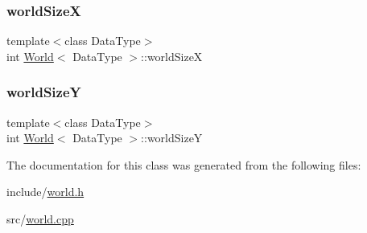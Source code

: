 \hypertarget{class_world_a63c69cc806d5b39a6943ef115d9eab83}{}\label{class_world_a63c69cc806d5b39a6943ef115d9eab83} 
\subsubsection{\texorpdfstring{world\+SizeX}{worldSizeX}}
{\footnotesize\ttfamily template$<$class Data\+Type$>$ \\
int \hyperlink{class_world}{World}$<$ Data\+Type $>$\+::world\+SizeX\hspace{0.3cm}{\ttfamily [private]}}

\hypertarget{class_world_a7a71c24a9af5ca1e66d7ed5300369460}{}\label{class_world_a7a71c24a9af5ca1e66d7ed5300369460} 
\subsubsection{\texorpdfstring{world\+SizeY}{worldSizeY}}
{\footnotesize\ttfamily template$<$class Data\+Type$>$ \\
int \hyperlink{class_world}{World}$<$ Data\+Type $>$\+::world\+SizeY\hspace{0.3cm}{\ttfamily [private]}}



The documentation for this class was generated from the following files\+:\begin{DoxyCompactItemize}
\item 
include/\hyperlink{world_8h}{world.\+h}\item 
src/\hyperlink{world_8cpp}{world.\+cpp}\end{DoxyCompactItemize}
